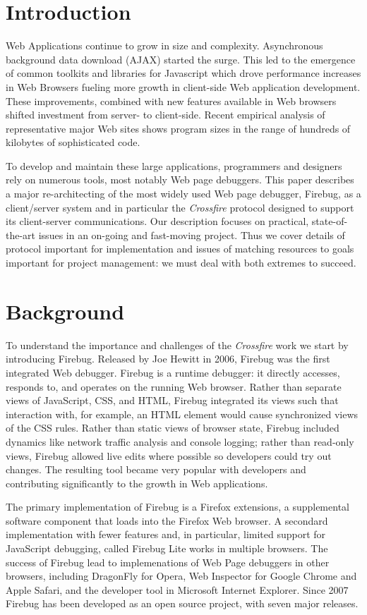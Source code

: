 
\section{Introduction}
Web Applications continue to grow in size and complexity. Asynchronous background 
data download (AJAX) started the surge. 
This led to the 
emergence of common toolkits and libraries for Javascript which drove  performance
increases in Web Browsers fueling more growth in client-side Web application
development. These improvements, combined with new features available in Web browsers 
shifted investment from server- to client-side. Recent empirical analysis of representative
 major Web sites shows program sizes in the range of hundreds of kilobytes of
sophisticated code.\cite{VitekDynamicJS2010}

To develop and maintain these large applications, programmers and designers rely on 
numerous tools, most notably Web page debuggers. 
This paper describes a major re-architecting of the most widely used Web page debugger, 
Firebug, as a client/server system and in particular the 
\textit{Crossfire} protocol designed to support its client-server communications.  
Our description focuses on practical, state-of-the-art issues in an on-going and fast-moving project. 
Thus we cover details of protocol important for implementation and issues of 
matching resources to goals important for project management: we must deal with both 
extremes to succeed.

\section{Background}
To understand the importance and challenges of the \textit{Crossfire} work we start by introducing Firebug.
Released by Joe Hewitt in 2006, Firebug was the first integrated Web debugger. Firebug is a runtime 
debugger: it directly accesses, responds to, and operates on the running Web browser.  Rather than separate 
views of JavaScript, CSS, and HTML, Firebug integrated its views such that interaction with, 
for example, an HTML element would cause synchronized views of the CSS rules. Rather than static 
 views of browser state, Firebug included dynamics like network traffic analysis and console logging; rather 
than read-only views, Firebug allowed live edits where possible so developers could try out changes.
The resulting tool became very popular with developers and contributing significantly to the growth in Web applications.

The primary implementation of Firebug is a Firefox extensions, a supplemental software 
component that loads into the Firefox Web browser. A secondard implementation with fewer features and, 
in particular, limited support for JavaScript debugging, called Firebug Lite works in multiple browsers. 
The success of Firebug lead to implemenations of Web Page debuggers in other browsers, including 
DragonFly for Opera, Web Inspector for Google Chrome and Apple Safari, and the developer tool in 
Microsoft Internet Explorer. Since 2007 Firebug has been developed as an open source project, with 
seven major releases.

